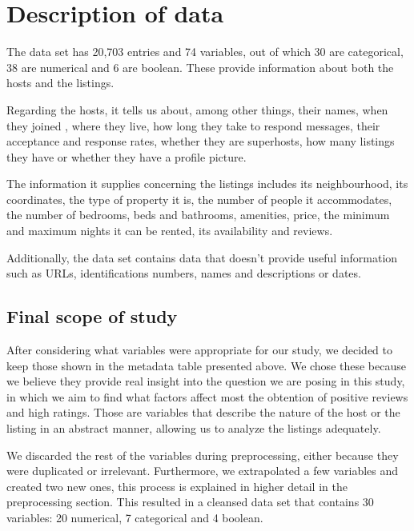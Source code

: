 


\section{Description of data}%
\label{sec:description_of_data}

The data set has 20,703 entries and 74 variables, out of which 30 are categorical,
38 are numerical and 6 are boolean. These provide information about both the hosts 
and the listings.

Regarding the hosts, it tells us about, among other things, their
names, when they joined \airbnb, where they live, how long they take to respond 
messages, their acceptance and response rates, whether they are superhosts, how 
many listings they have or whether they have a profile picture.

The information it supplies concerning the listings includes its
neighbourhood, its coordinates, the type of property it is, the number of people 
it accommodates, the number of bedrooms, beds and bathrooms, amenities, price, 
the minimum and maximum nights it can be rented, its availability and reviews.

Additionally, the data set contains data that doesn't provide useful information such
as URLs, identifications numbers, names and descriptions or dates.






\subsection{Final scope of study}

After considering what variables were appropriate for our study, we decided to keep 
those shown in the metadata table presented above. We chose these because
we believe they provide real insight into the question we are posing in this study,
in which we aim to find what factors affect most the obtention of positive reviews
and high ratings. Those are variables that describe the nature of the host or
the listing in an abstract manner, allowing us to analyze the listings adequately.

We discarded the rest
of the variables during preprocessing, either because they were duplicated or
irrelevant. Furthermore, we extrapolated a few variables and created 
two new ones, this process is explained in higher detail in the preprocessing 
section. This resulted in a cleansed data set that contains 30 variables: 
20 numerical, 7 categorical and 4 boolean.